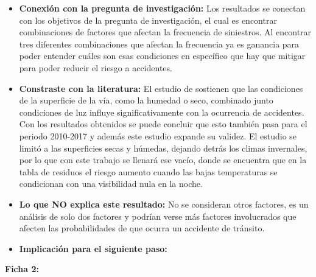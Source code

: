 \documentclass[12pt]{article}
\begin{document}
\begin{itemize}
    \item \textbf{Conexión con la pregunta de investigación:} Los resultados se conectan con los objetivos de la 
    pregunta de investigación, el cual es encontrar combinaciones de factores que afectan la frecuencia de siniestros.
    Al encontrar tres diferentes combinaciones que afectan la frecuencia ya es ganancia para poder entender cuáles son 
    esas condiciones en específico que hay que mitigar para poder reducir el riesgo a accidentes.
    
	\item \textbf{Constraste con la literatura:} El estudio de \textcite{KARZAN2017} sostienen que las condiciones de la superficie de la 
	vía, como la humedad o seco, combinado junto condiciones de luz influye significativamente con la 
	ocurrencia de accidentes. Con los resultados obtenidos se puede concluir que esto también pasa para el periodo
	2010-2017 y además este estudio expande su validez.  El estudio se limitó a las superficies secas y húmedas, 
	dejando detrás los climas invernales, por lo que con este trabajo se llenará ese vacío, donde se encuentra
	que en la tabla de residuos el riesgo aumento cuando las bajas temperaturas se condicionan con una visibilidad nula en la noche.
   	
	\item \textbf{Lo que NO explica este resultado:}   No se consideran otros factores, es un 
	análisis de solo dos factores y podrían verse más factores involucrados que afecten las probabilidades de que ocurra un accidente de tránsito.
    
	\item \textbf{Implicación para el siguiente paso:} \\
	
	
\end{itemize}


\textbf{Ficha 2:}
\end{document}
